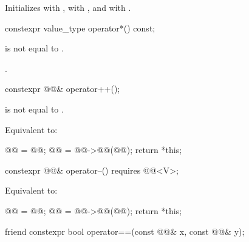 \begin{itemdescr}
\pnum
\effects
Initializes  with ,
 with , and
 with .
\end{itemdescr}

%
\begin{itemdecl}
constexpr value_type operator*() const;
\end{itemdecl}

\begin{itemdescr}
\pnum
\expects
{} is not equal to .

\pnum
\returns
{}.
\end{itemdescr}

%
\begin{itemdecl}
constexpr @@& operator++();
\end{itemdecl}

\begin{itemdescr}
\pnum
\expects
{} is not equal to .

\pnum
\effects
Equivalent to:
\begin{codeblock}
@@ = @@;
@@ = @@->@@(@@);
return *this;
\end{codeblock}
\end{itemdescr}

%
\begin{itemdecl}
constexpr @@& operator--() requires @@<V>;
\end{itemdecl}

\begin{itemdescr}
\pnum
\effects
Equivalent to:
\begin{codeblock}
@@ = @@;
@@ = @@->@@(@@);
return *this;
\end{codeblock}
\end{itemdescr}

%
\begin{itemdecl}
friend constexpr bool operator==(const @@& x, const @@& y);
\end{itemdecl}

